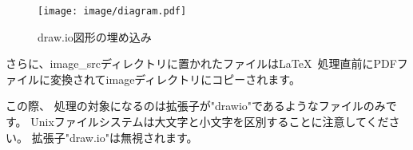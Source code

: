 \begin{wrapfigure}[10]{O}[0pt]{0\textwidth}
    \texttt{[image: image/diagram.pdf]}
    \caption{draw.io図形の埋め込み}\label{embeded_drawio}
\end{wrapfigure}

さらに、image\_srcディレクトリに置かれたファイルは\LaTeX\
処理直前にPDFファイルに変換されてimageディレクトリにコピーされます。

この際、
処理の対象になるのは拡張子が"drawio"であるようなファイルのみです。
Unixファイルシステムは大文字と小文字を区別することに注意してください。
拡張子"draw.io"は無視されます。

